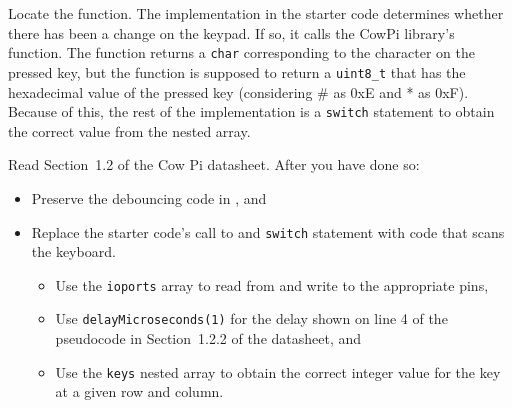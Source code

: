 Locate the  function.
The implementation in the starter code determines whether there has been a change on the keypad.
If so, it calls the CowPi library's  function.
The  function returns a \lstinline{char} corresponding to the character on the pressed key,
but the  function is supposed to return a \lstinline{uint8_t} that has the hexadecimal value of the pressed key (considering \# as 0xE and * as 0xF).
Because of this, the rest of the implementation is a \lstinline{switch} statement to obtain the correct value from the  nested array.

Read Section~1.2 of the Cow Pi datasheet.
After you have done so:

\begin{itemize}
    \item Preserve the debouncing code in , and
    \item Replace the starter code's call to  and \lstinline{switch} statement with code that scans the keyboard.
        \begin{itemize}
            \item Use the \lstinline{ioports} array to read from and write to the appropriate pins,
            \item Use \lstinline{delayMicroseconds(1)} for the delay shown on line 4 of the pseudocode in Section~1.2.2 of the datasheet, and
            \item Use the \lstinline{keys} nested array to obtain the correct integer value for the key at a given row and column.
        \end{itemize}
\end{itemize}

